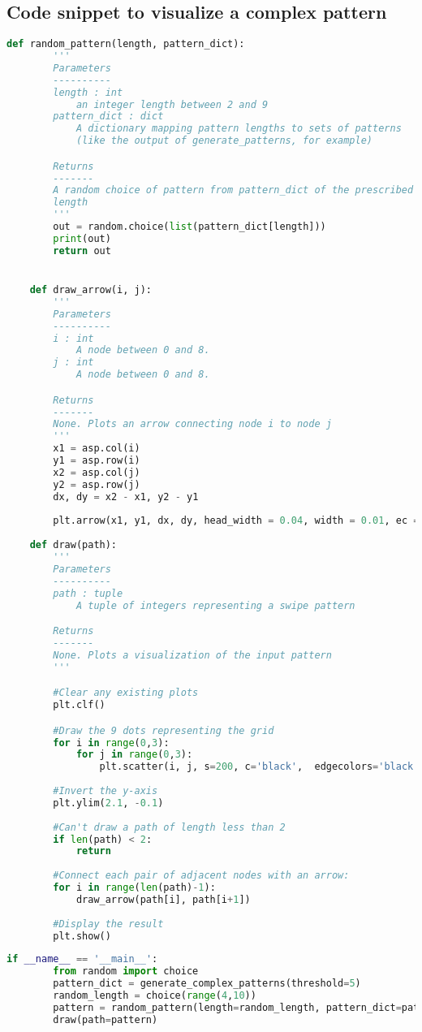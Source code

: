 \documentclass[12pt]{article}
\theoremstyle{definition}
\begin{document}
\subsection*{Code snippet to visualize a complex pattern}
\begin{lstlisting}[language=Python, caption=Code snippet to visualize a complex pattern]
    def random_pattern(length, pattern_dict):
        '''
        Parameters
        ----------
        length : int
            an integer length between 2 and 9
        pattern_dict : dict
            A dictionary mapping pattern lengths to sets of patterns 
            (like the output of generate_patterns, for example)

        Returns
        -------
        A random choice of pattern from pattern_dict of the prescribed
        length  
        '''
        out = random.choice(list(pattern_dict[length]))
        print(out)
        return out


    def draw_arrow(i, j):
        '''
        Parameters
        ----------
        i : int
            A node between 0 and 8.
        j : int
            A node between 0 and 8.

        Returns
        -------
        None. Plots an arrow connecting node i to node j
        '''
        x1 = asp.col(i)
        y1 = asp.row(i)
        x2 = asp.col(j)
        y2 = asp.row(j)
        dx, dy = x2 - x1, y2 - y1
    
        plt.arrow(x1, y1, dx, dy, head_width = 0.04, width = 0.01, ec ='green')
       
    def draw(path):
        '''
        Parameters
        ----------
        path : tuple
            A tuple of integers representing a swipe pattern

        Returns
        -------
        None. Plots a visualization of the input pattern
        '''

        #Clear any existing plots
        plt.clf()

        #Draw the 9 dots representing the grid
        for i in range(0,3):
            for j in range(0,3):      
                plt.scatter(i, j, s=200, c='black',  edgecolors='black')
                
        #Invert the y-axis
        plt.ylim(2.1, -0.1)
        
        #Can't draw a path of length less than 2
        if len(path) < 2: 
            return
        
        #Connect each pair of adjacent nodes with an arrow:
        for i in range(len(path)-1):
            draw_arrow(path[i], path[i+1])
            
        #Display the result
        plt.show()
\end{lstlisting}

\begin{lstlisting}[language=Python, caption=Plot of complex pattern]
    if __name__ == '__main__':
        from random import choice
        pattern_dict = generate_complex_patterns(threshold=5)
        random_length = choice(range(4,10))
        pattern = random_pattern(length=random_length, pattern_dict=pattern_dict)
        draw(path=pattern)
\end{lstlisting}
\end{document}

